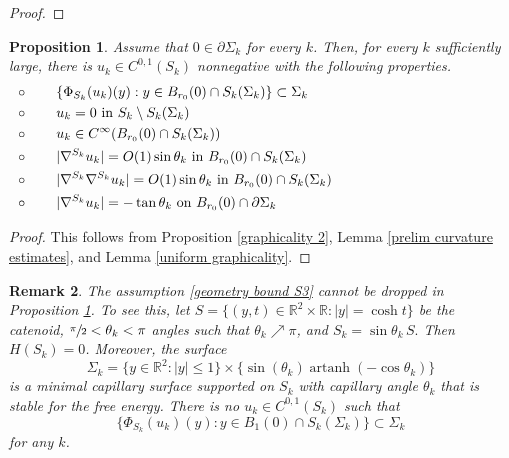 \documentclass[11pt]{amsart}
\newtheorem{prop}{Proposition}
\newtheorem{rema}[prop]{Remark}
\begin{document}
\begin{proof}
\end{proof}

	\begin{prop} \label{curvature estimates}
Assume that $0\in \partial \Sigma_k$ for every $k$. Then, for every $k$ sufficiently large, there is  $ u_k\in C^{0,1}(S_k)$ nonnegative with the following properties.
\begin{equation*}
	\begin{aligned}
		&\circ\qquad \text{$ \{\Phi_{S_k}(u_k)(y):y\in B_{r_0}(0)\cap S_k(\Sigma_k)\}$}\subset \Sigma_k\hspace{5cm}\\ 		
		&\circ\qquad \text{$u_k=0$ in $S_k\setminus S_k(\Sigma_k)$} \\
		&\circ\qquad \text{$ u_k\in C^\infty(B_{r_0} (0)\cap S_k(\Sigma_k))$}\\ 
		&\circ\qquad \text{$|\nabla^{S_k} u_k|=O(1) \sin\theta_k$ in $ B_{r_0}(0)\cap S_k(\Sigma_k)$}\\
		&\circ\qquad \text{$|\nabla^{S_k}\nabla^{S_k} u_k|=O(1)\sin\theta_k$ in $B_{r_0}(0)\cap  S_k(\Sigma_k)$}\\ 
		&\circ\qquad \text{$|\nabla^{S_k} u_k|=-\tan\theta_k$ on $B_{r_0}(0)\cap \partial \Sigma_k $}
	\end{aligned}
\end{equation*}
\end{prop}
\begin{proof}
This follows from Proposition \ref{graphicality 2}, Lemma \ref{prelim curvature estimates}, and Lemma \ref{uniform graphicality}.

\end{proof}
\begin{rema} \label{counter 3}
The assumption \eqref{geometry bound S3} cannot be dropped in Proposition \ref{curvature estimates}. To see this, let $S=\{(y,t)\in \mathbb{R}^2\times \mathbb{R}:|y|=\cosh t\}$ be the catenoid, $\sfrac{\pi}2<\theta_k<\pi$ angles such that $\theta_k\nearrow \pi$, and $S_k= \sin\theta_k\,S.$ Then $H(S_k)=0$. Moreover, the surface  $$\Sigma_k= \{y\in \mathbb{R}^2:|y|\leq1\}\times\{\sin(\theta_k)\operatorname{artanh}(-\cos\theta_k)\}$$  is a minimal capillary surface supported on $S_k$ with capillary angle $\theta_k$ that is stable for the free energy. There is no $u_k\in C^{0,1}(S_k)$ such that 
$$
\{\Phi_{S_k}(u_k)(y):y\in B_{1}(0)\cap S_k(\Sigma_k)\}\subset \Sigma_k
$$
for any $k$.
\end{rema}
\end{document}
